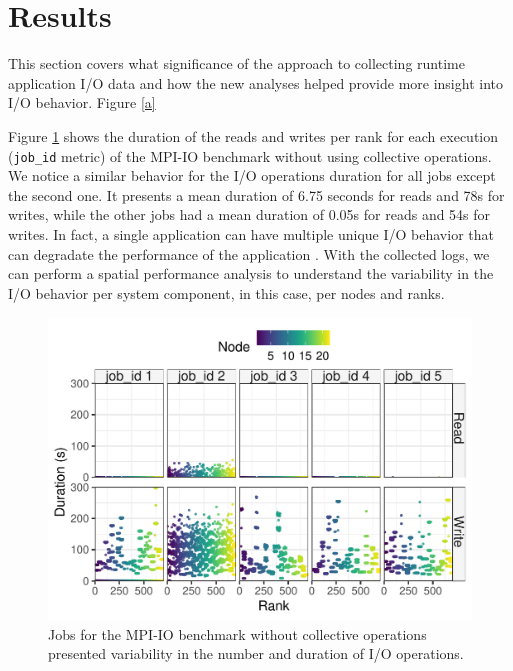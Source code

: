 \section{Results}
\label{sec:results}

This section covers what significance of the approach to collecting
runtime application I/O data and how the new analyses helped provide
more insight into I/O behavior. Figure \ref{a}



Figure \ref{f:mpi_io} shows the duration of the reads and writes per
rank for each execution (\texttt{job\_id} metric) of the MPI-IO
benchmark without using collective operations. We notice a similar
behavior for the I/O operations duration for all jobs except the
second one. It presents a mean duration of 6.75 seconds for reads and
78s for writes, while the other jobs had a mean duration of 0.05s for
reads and 54s for writes. In fact, a single application can have
multiple unique I/O behavior that can degradate the performance of the
application \cite{costa2021}. With the collected logs, we can perform
a spatial performance analysis to understand the variability in the
I/O behavior per system component, in this case, per nodes and
ranks. 

\begin{figure}
	\centering
        \includegraphics[width=\linewidth]{figs/mpi_io_luster_no_coll_duration_allexperiments.pdf}
	\caption{Jobs for the MPI-IO benchmark without collective
          operations presented variability in the number and duration
          of I/O operations.}
	\label{f:mpi_io}
      \end{figure}

